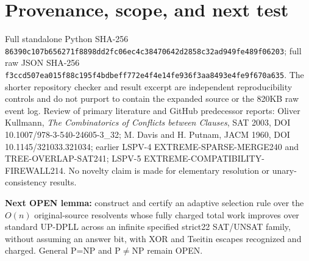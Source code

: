 \documentclass[11pt]{article}
\begin{document}
\section{Provenance, scope, and next test}
Full standalone Python SHA-256 \texttt{86390c107b656271f8898dd2fc06ec4c38470642d2858c32ad949fe489f06203}; full raw JSON SHA-256 \texttt{f3ccd507ea015f88c195f4bdbeff772e4f4e14fe936f3aa8493e4fe9f670a635}. The shorter repository checker and result excerpt are independent reproducibility controls and do not purport to contain the expanded source or the 820KB raw event log. Review of primary literature and GitHub predecessor reports: Oliver Kullmann, \emph{The Combinatorics of Conflicts between Clauses}, SAT 2003, DOI 10.1007/978-3-540-24605-3\_32; M. Davis and H. Putnam, JACM 1960, DOI 10.1145/321033.321034; earlier LSPV-4 EXTREME-SPARSE-MERGE240 and TREE-OVERLAP-SAT241; LSPV-5 EXTREME-COMPATIBILITY-FIREWALL214. No novelty claim is made for elementary resolution or unary-consistency results.

\noindent\textbf{Next OPEN lemma:} construct and certify an adaptive selection rule over the $O(n)$ original-source resolvents whose fully charged total work improves over standard UP-DPLL across an infinite specified strict22 SAT/UNSAT family, without assuming an answer bit, with XOR and Tseitin escapes recognized and charged. General P=NP and P$\ne$NP remain OPEN.
\end{document}
